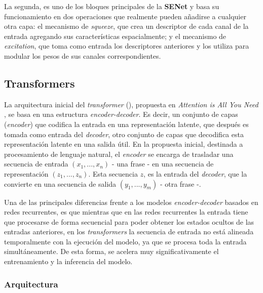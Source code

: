La segunda, es uno de los bloques principales de la \textbf{SENet} \cite{senet} y basa su funcionamiento en dos operaciones que realmente pueden añadirse a cualquier otra capa: el mecanismo de \textit{squeeze}, que crea un descriptor de cada canal de la entrada agregando sus características espacialmente; y el mecanismo de \textit{excitation}, que toma como entrada los descriptores anteriores y los utiliza para modular los pesos de sus canales correspondientes.

\subsection{Transformers}
La arquitectura inicial del \textit{transformer} (), propuesta en \textit{Attention is All You Need} \cite{NIPS2017_3f5ee243}, se basa en una estructura \textit{encoder-decoder}. Es decir, un conjunto de capas (\textit{encoder}) que codifica la entrada en una representación latente, que después es tomada como entrada del \textit{decoder}, otro conjunto de capas que decodifica esta representación latente en una salida útil. En la propuesta inicial, destinada a procesamiento de lenguaje natural, el \textit{encoder} se encarga de trasladar una secuencia de entrada $(x_1, ..., x_n)$ - una frase - en una secuencia de representación $(z_1, ..., z_n)$. Esta secuencia $z$, es la entrada del \textit{decoder}, que la convierte en una secuencia de salida $(y_1, ..., y_m)$ - otra frase -. 

Una de las principales diferencias frente a los modelos \textit{encoder-decoder} basados en redes recurrentes, es que mientras que en las redes recurrentes la entrada tiene que procesarse de forma secuencial para poder obtener los estados ocultos de las entradas anteriores, en los \textit{transformers} la secuencia de entrada no está alineada temporalmente con la ejecución del modelo, ya que se procesa toda la entrada simultáneamente. De esta forma, se acelera muy significativamente el entrenamiento y la inferencia del modelo.

\subsubsection{Arquitectura}

\vspace{2mm}

